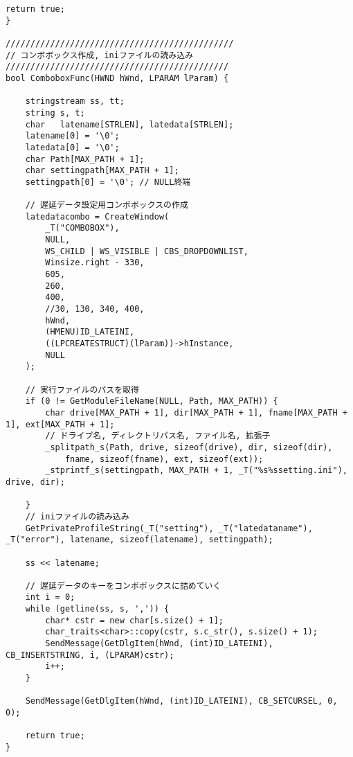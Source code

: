 \begin{lstlisting}[caption=window.cpp]
	return true;
}

//////////////////////////////////////////////
// コンボボックス作成, iniファイルの読み込み
/////////////////////////////////////////////
bool ComboboxFunc(HWND hWnd, LPARAM lParam) {

	stringstream ss, tt;
	string s, t;
	char   latename[STRLEN], latedata[STRLEN];
	latename[0] = '\0';
	latedata[0] = '\0';
	char Path[MAX_PATH + 1];
	char settingpath[MAX_PATH + 1];
	settingpath[0] = '\0'; // NULL終端

	// 遅延データ設定用コンボボックスの作成
	latedatacombo = CreateWindow(
		_T("COMBOBOX"),
		NULL,
		WS_CHILD | WS_VISIBLE | CBS_DROPDOWNLIST,
		Winsize.right - 330,
		605,
		260,
		400,
		//30, 130, 340, 400,
		hWnd,
		(HMENU)ID_LATEINI,
		((LPCREATESTRUCT)(lParam))->hInstance,
		NULL
	);

	// 実行ファイルのパスを取得
	if (0 != GetModuleFileName(NULL, Path, MAX_PATH)) {
		char drive[MAX_PATH + 1], dir[MAX_PATH + 1], fname[MAX_PATH + 1], ext[MAX_PATH + 1];
		// ドライブ名, ディレクトリパス名, ファイル名, 拡張子
		_splitpath_s(Path, drive, sizeof(drive), dir, sizeof(dir),
			fname, sizeof(fname), ext, sizeof(ext));
		_stprintf_s(settingpath, MAX_PATH + 1, _T("%s%ssetting.ini"), drive, dir);

	}
	// iniファイルの読み込み
	GetPrivateProfileString(_T("setting"), _T("latedataname"), _T("error"), latename, sizeof(latename), settingpath);

	ss << latename;

	// 遅延データのキーをコンボボックスに詰めていく
	int i = 0;
	while (getline(ss, s, ',')) {
		char* cstr = new char[s.size() + 1];
		char_traits<char>::copy(cstr, s.c_str(), s.size() + 1);
		SendMessage(GetDlgItem(hWnd, (int)ID_LATEINI), CB_INSERTSTRING, i, (LPARAM)cstr);
		i++;
	}

	SendMessage(GetDlgItem(hWnd, (int)ID_LATEINI), CB_SETCURSEL, 0, 0);

	return true;
}
\end{lstlisting}


